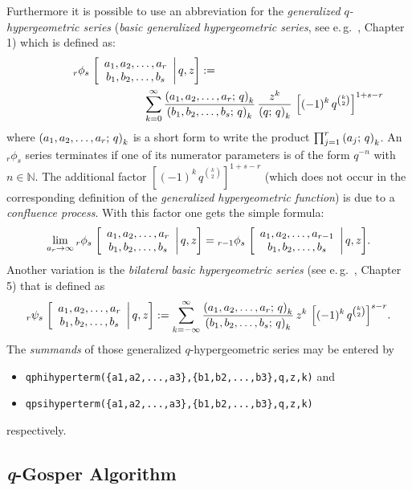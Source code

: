 Furthermore it is possible to use an abbreviation for the
{\sl generalized $q$-hypergeometric series}
({\sl basic generalized hypergeometric series}, 
see e.\,g.\ \cite{GasperRahman}, Chapter 1) which is defined as:
\begin{eqnarray*}
	\qphihyp{r}{s}{a_1,a_2,\ldots,a_r}{b_1,b_2,\ldots,b_s}{z}:= 
	\hspace{15em}\\ \hspace{10em}
	\sum_{k=0}^{\infty}{\frac{\qfac{a_1,a_2,\ldots,a_r}{k}}
	{\qfac{b_1,b_2,\ldots,b_s}{k}}
	\,\frac{z^k}{\qfac{q}{k}}\,\left[(-1)^k\,
	q^{\binom{k}{2}}\right]^{1+s-r}}
\end{eqnarray*}
where $\qfac{a_1,a_2,\ldots,a_r}{k}$ is a short form to write the
product $\prod_{j=1}^r{\qfac{a_j}{k}}$. An ${}_r\phi_s$ series
terminates if one of its numerator parameters is of the form
$q^{-n}$ with $n\in\mathbb{N}$. The additional factor
$\left[(-1)^k\,q^{\binom{k}{2}}\right]^{1+s-r}$ (which does not
occur in the corresponding definition of the {\sl generalized
hypergeometric function}) is due to a {\sl confluence process}.
With this factor one gets the simple formula:
\[
	\lim_{a_r\rightarrow\infty}{\qphihyp{r}{s}{a_1,a_2,\ldots,a_r}
	{b_1,b_2,\ldots,b_s}{z}} = 
	{\qphihyp{r-1}{s}{a_1,a_2,\ldots,a_{r-1}}{b_1,b_2,\ldots,b_s}{z}}.
\]
Another variation is the {\sl bilateral basic hypergeometric
series} (see e.\,g.\ \cite{GasperRahman}, Chapter 5) that is defined as
\[
	\qpsihyp{r}{s}{a_1,a_2,\ldots,a_r}{b_1,b_2,\ldots,b_s}{z}:=
	\sum_{k=-\infty}^{\infty}{\frac{\qfac{a_1,a_2,\ldots,a_r}{k}}
	{\qfac{b_1,b_2,\ldots,b_s}{k}}\,z^k\,
	\left[(-1)^k\,q^{\binom{k}{2}}\right]^{s-r}}.
\]
The \textsl{summands} of those generalized $q$-hypergeometric series may
be entered by
\begin{itemize}
	\item {\protect\verb-qphihyperterm({a1,a2,...,a3},{b1,b2,...,b3},q,z,k)-}
		and
	\item {\protect\verb-qpsihyperterm({a1,a2,...,a3},{b1,b2,...,b3},q,z,k)-}
\end{itemize}
respectively.


\subsection{\textsl{q}-Gosper Algorithm}
\label{qgosper}

